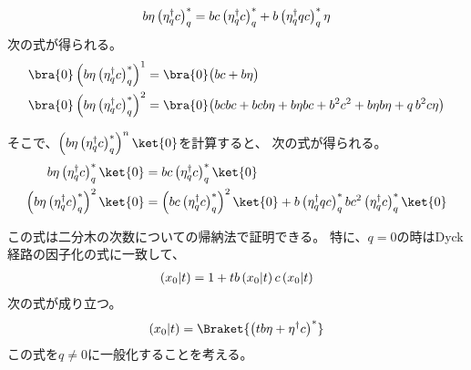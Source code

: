 {\begin{todo}[ここまで]
\begin{itemize}
\begin{equation*}
\begin{split}
				b\eta\left({\eta_q^\dag c}\right)_q^* = bc\left({\eta_q^\dag c}\right)_q^*
				+ b\left({\eta_q^\dag qc}\right)_q^*\eta
			\end{split}\end{equation*}
			次の式が得られる。
			\begin{equation*}\begin{split}
				\bra{0}\lr{b\eta\lr{\eta_q^\dag c}_q^*}^1 
				&= \bra{0}\glr{bc + b\eta} \\
				\bra{0}\lr{b\eta\lr{\eta_q^\dag c}_q^*}^2
				&= \bra{0}\glr{bcbc + bcb\eta + b\eta bc + b^2c^2
					+ b\eta b\eta + q\,b^2c\eta} \\
			\end{split}\end{equation*}

			そこで、$\lr{b\eta\lr{\eta_q^\dag c}_q^*}^n\ket{0}$を計算すると、
			次の式が得られる。
			\begin{equation*}\begin{split}
				b\eta\lr{\eta_q^\dag c}_q^*\ket{0} 
				&= bc\lr{\eta_q^\dag c}_q^*\ket{0} \\
				\lr{b\eta\lr{\eta_q^\dag c}_q^*}^2\ket{0} 
				&= \lr{bc\lr{\eta_q^\dag c}_q^*}^2\ket{0}
					+ b\lr{\eta_q^\dag qc}_q^* bc^2\lr{\eta_q^\dag c}_q^*\ket{0} \\
			\end{split}\end{equation*}
		\end{itemize} %
	\end{todo} %

	この式は二分木の次数についての帰納法で証明できる。
	特に、$q=0$の時はDyck経路の因子化の式に一致して、
	\begin{equation*}\begin{split}
		\left({x_0|t}\right) = 1 + tb\left({x_0|t}\right)c\left({x_0|t}\right)
	\end{split}\end{equation*}
	次の式が成り立つ。
	\begin{equation}\label{eq:zero-Dyck言語}\begin{split}
		\lr{x_0|t} = \Braket{\lr{tb\eta + \eta^\dag c}^*}
	\end{split}\end{equation}
	この式を$q\neq0$に一般化することを考える。

}
